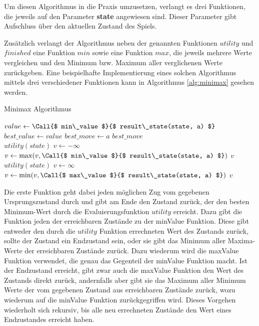 
Um diesen Algorithmus in die Praxis umzusetzen, verlangt es drei Funktionen, die jeweils auf den Parameter \textbf{state} angewiesen sind. Dieser Parameter gibt Aufschluss über den aktuellen Zustand des Spiels.

Zusätzlich verlangt der Algorithmus neben der genannten Funktionen $utility$ und $finished$ eine Funktion $min$ sowie eine Funktion $max$, die jeweils mehrere Werte vergleichen und den Minimum bzw. Maximum aller verglichenen Werte zurückgeben. Eine beispielhafte Implementierung eines solchen Algorithmus mittels drei verschiedener Funktionen kann in Algorithmus \ref{alg:minimax} gesehen werden.

\begin{algorithm}[h]
\caption{Minimax Algorithmus \cite{Russell2010}}
\label{alg:minimax}
\begin{algorithmic}
		\State $ value  \gets \Call{$ min\_value $}{$ result\_state(state, a) $}$
			\State $ best\_value  \gets  value $
			\State $ best\_move  \gets  a $
		\EndIf
	\EndFor
	\State \Return $ best\_move $
\EndFunction
\\
	 \State \Return $ utility(state) $ \EndIf
	\State $ v  \gets -\infty$
		\State $v \gets \max( v , \Call{$ min\_value $}{$ result\_state(state, a) $})$
	\EndFor
	\State \Return $v$
\EndFunction
\\
	 \State \Return $ utility(state) $ \EndIf
	\State $ v  \gets \infty$
		\State $v \gets \min( v , \Call{$ max\_value $}{$ result\_state(state, a) $})$
	\EndFor
	\State \Return $v$
\EndFunction
\end{algorithmic}
\end{algorithm}

Die erste Funktion geht dabei jeden möglichen Zug vom gegebenen Ursprungszustand durch und gibt am Ende den Zustand zurück, der den besten Minimum-Wert durch die Evaluierungsfunktion $utility$ erreicht. Dazu gibt die Funktion jeden der erreichbaren Zustände zu der minValue Funktion. Diese gibt entweder den durch die $utility$ Funktion errechneten Wert des Zustands zurück, sollte der Zustand ein Endzustand sein, oder sie gibt das Minimum aller Maxima-Werte der erreichbaren Zustände zurück. Dazu wiederum wird die maxValue Funktion verwendet, die genau das Gegenteil der minValue Funktion macht. Ist der Endzustand erreicht, gibt zwar auch die maxValue Funktion den Wert des Zustands direkt zurück, andernfalls aber gibt sie das Maximum aller Minimum Werte der vom gegebenen Zustand aus erreichbaren Zustände zurück, wozu wiederum auf die minValue Funktion zurückgegriffen wird. Dieses Vorgehen wiederholt sich rekursiv, bis alle neu errechneten Zustände den Wert eines Endzustandes erreicht haben. \cite{Russell2010}

